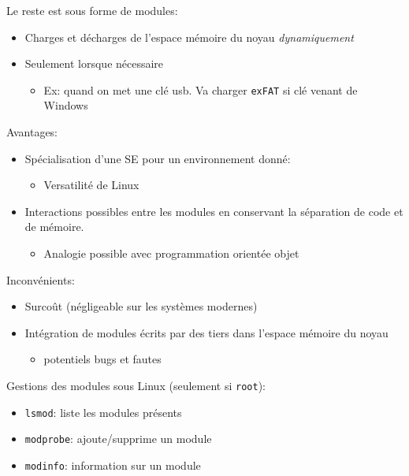 Le reste est sous forme de modules:

\begin{itemize}
\tightlist
\item
  Charges et décharges de l'espace mémoire du noyau \emph{dynamiquement}
\item
  Seulement lorsque nécessaire

  \begin{itemize}
  \tightlist
  \item
    Ex: quand on met une clé usb. Va charger \texttt{exFAT} si clé
    venant de Windows
  \end{itemize}
\end{itemize}

Avantages:

\begin{itemize}
\tightlist
\item
  Spécialisation d'une SE pour un environnement donné:

  \begin{itemize}
  \tightlist
  \item
    Versatilité de Linux
  \end{itemize}
\item
  Interactions possibles entre les modules en conservant la séparation
  de code et de mémoire.

  \begin{itemize}
  \tightlist
  \item
    Analogie possible avec programmation orientée objet
  \end{itemize}
\end{itemize}

Inconvénients:

\begin{itemize}
\tightlist
\item
  Surcoût (négligeable sur les systèmes modernes)
\item
  Intégration de modules écrits par des tiers dans l'espace mémoire du
  noyau

  \begin{itemize}
  \tightlist
  \item
    potentiels bugs et fautes
  \end{itemize}
\end{itemize}

Gestions des modules sous Linux (seulement si \texttt{root}):

\begin{itemize}
\tightlist
\item
  \texttt{lsmod}: liste les modules présents
\item
  \texttt{modprobe}: ajoute/supprime un module
\item
  \texttt{modinfo}: information sur un module
\end{itemize}

